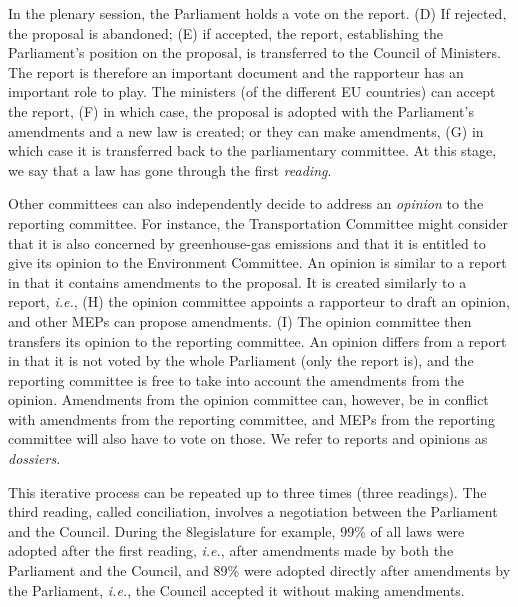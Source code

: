 In the plenary session, the Parliament holds a vote on the report.
(D) If rejected, the proposal is abandoned; (E) if accepted, the report, establishing the Parliament's position on the proposal, is transferred to the Council of Ministers.
The report is therefore an important document and the rapporteur has an important role to play.
The ministers (of the different EU countries) can accept the report, (F) in which case, the proposal is adopted with the Parliament's amendments and a new law is created; or they can make amendments, (G) in which case it is transferred back to the parliamentary committee.
At this stage, we say that a law has gone through the first \textit{reading}.

Other committees can also independently decide to address an \textit{opinion} to the reporting committee.
For instance, the Transportation Committee might consider that it is also concerned by greenhouse-gas emissions and that it is entitled to give its opinion to the Environment Committee.
An opinion is similar to a report in that it contains amendments to the proposal.
It is created similarly to a report, \textit{i.e.}, (H) the opinion committee appoints a rapporteur to draft an opinion, and other MEPs can propose amendments.
(I) The opinion committee then transfers its opinion to the reporting committee.
An opinion differs from a report in that it is not voted by the whole Parliament (only the report is), and the reporting committee is free to take into account the amendments from the opinion.
Amendments from the opinion committee can, however, be in conflict with amendments from the reporting committee, and MEPs from the reporting committee will also have to vote on those.
We refer to reports and opinions as \textit{dossiers}.

This iterative process can be repeated up to three times (three readings).
The third reading, called conciliation, involves a negotiation between the Parliament and the Council.
During the 8\th legislature for example, 99\% of all laws were adopted after the first reading, \textit{i.e.}, after amendments made by both the Parliament and the Council, and 89\% were adopted directly after amendments by the Parliament, \textit{i.e.}, the Council accepted it without making amendments.

